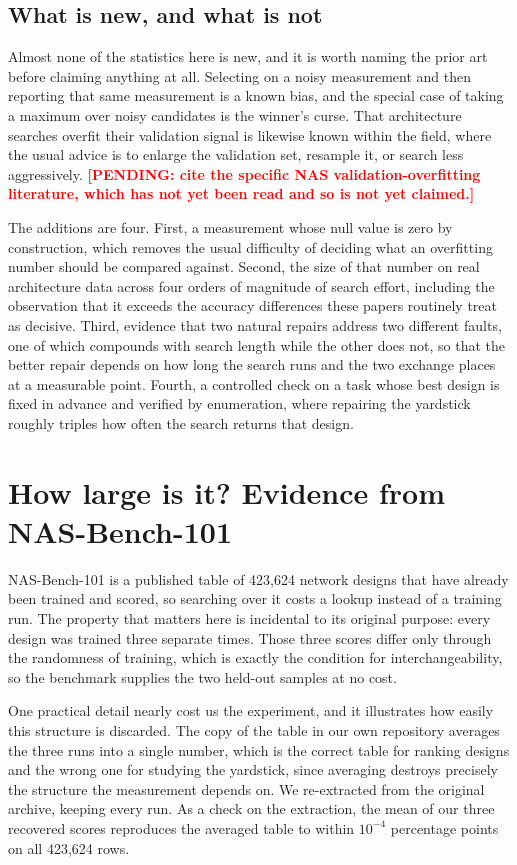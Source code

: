 \documentclass[11pt]{article}
\newcommand{\pending}[1]{\textcolor{red}{\textbf{[PENDING: #1]}}}
\begin{document}
\subsection{What is new, and what is not}

Almost none of the statistics here is new, and it is worth naming the prior art before claiming anything
at all. Selecting on a noisy measurement and then reporting that same measurement is a known bias, and
the special case of taking a maximum over noisy candidates is the winner's curse. That architecture
searches overfit their validation signal is likewise known within the field, where the usual advice is
to enlarge the validation set, resample it, or search less aggressively.
\pending{cite the specific NAS validation-overfitting literature, which has not yet been read and so is
not yet claimed.}

The additions are four. First, a measurement whose null value is zero by construction, which removes the
usual difficulty of deciding what an overfitting number should be compared against. Second, the size of
that number on real architecture data across four orders of magnitude of search effort, including the
observation that it exceeds the accuracy differences these papers routinely treat as decisive. Third,
evidence that two natural repairs address two different faults, one of which compounds with search
length while the other does not, so that the better repair depends on how long the search runs and the
two exchange places at a measurable point. Fourth, a controlled check on a task whose best design is
fixed in advance and verified by enumeration, where repairing the yardstick roughly triples how often
the search returns that design.

\section{How large is it? Evidence from NAS-Bench-101}\label{sec:nb101}

NAS-Bench-101 \cite{nb101} is a published table of 423,624 network designs that have already been
trained and scored, so searching over it costs a lookup instead of a training run. The property that
matters here is incidental to its original purpose: every design was trained three separate times.
Those three scores differ only through the randomness of training, which is exactly the condition for
interchangeability, so the benchmark supplies the two held-out samples at no cost.

One practical detail nearly cost us the experiment, and it illustrates how easily this structure is
discarded. The copy of the table in our own repository averages the three runs into a single number,
which is the correct table for ranking designs and the wrong one for studying the yardstick, since
averaging destroys precisely the structure the measurement depends on. We re-extracted from the original
archive, keeping every run. As a check on the extraction, the mean of our three recovered scores
reproduces the averaged table to within $10^{-4}$ percentage points on all 423,624 rows.
\end{document}
